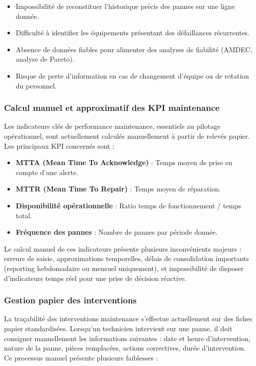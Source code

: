 \begin{itemize}
    \item Impossibilité de reconstituer l'historique précis des pannes sur une ligne donnée.
    \item Difficulté à identifier les équipements présentant des défaillances récurrentes.
    \item Absence de données fiables pour alimenter des analyses de fiabilité (AMDEC, analyse de Pareto).
    \item Risque de perte d'information en cas de changement d'équipe ou de rotation du personnel.
\end{itemize}

\subsubsection{Calcul manuel et approximatif des KPI maintenance}

Les indicateurs clés de performance maintenance, essentiels au pilotage opérationnel, sont actuellement calculés manuellement à partir de relevés papier. Les principaux KPI concernés sont :

\begin{itemize}
    \item \textbf{MTTA (Mean Time To Acknowledge)} : Temps moyen de prise en compte d'une alerte.
    \item \textbf{MTTR (Mean Time To Repair)} : Temps moyen de réparation.
    \item \textbf{Disponibilité opérationnelle} : Ratio temps de fonctionnement / temps total.
    \item \textbf{Fréquence des pannes} : Nombre de pannes par période donnée.
\end{itemize}


Le calcul manuel de ces indicateurs présente plusieurs inconvénients majeurs : erreurs de saisie, approximations temporelles, délais de consolidation importants (reporting hebdomadaire ou mensuel uniquement), et impossibilité de disposer d'indicateurs temps réel pour une prise de décision réactive.

\subsubsection{Gestion papier des interventions}

La traçabilité des interventions maintenance s'effectue actuellement sur des fiches papier standardisées. Lorsqu'un technicien intervient sur une panne, il doit consigner manuellement les informations suivantes : date et heure d'intervention, nature de la panne, pièces remplacées, actions correctives, durée d'intervention. Ce processus manuel présente plusieurs faiblesses :

